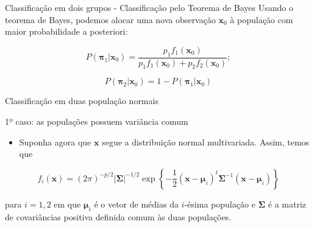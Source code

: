 \documentclass[
  ignorenonframetext,
  aspectratio=169,
]{beamer}
\providecommand{\tightlist}{%
  \setlength{\itemsep}{0pt}\setlength{\parskip}{0pt}}
\begin{document}
\begin{frame}{Classificação em dois grupos - Classificação pelo Teorema
de Bayes}
\label{classificauxe7uxe3o-em-dois-grupos---classificauxe7uxe3o-pelo-teorema-de-bayes}
Usando o teorema de Bayes, podemos alocar uma nova observação
\(\boldsymbol{x}_0\) à população com maior probabilidade a posteriori:

\[P(\boldsymbol{\pi}_1|\boldsymbol{x}_0) = \dfrac{p_1f_1(\boldsymbol{x}_0)}{p_1f_1(\boldsymbol{x}_0) + p_2f_2(\boldsymbol{x}_0)};\]

\[P(\boldsymbol{\pi}_2|\boldsymbol{x}_0) = 1 - P(\boldsymbol{\pi}_1|\boldsymbol{x}_0)\]
\end{frame}

\begin{frame}{Classificação em duas população normais}
\label{classificauxe7uxe3o-em-duas-populauxe7uxe3o-normais}
\begin{block}{1º caso: as populações possuem variância comum}
\label{uxba-caso-as-populauxe7uxf5es-possuem-variuxe2ncia-comum}
\begin{itemize}
\tightlist
\item
  Suponha agora que \(\boldsymbol{x}\) segue a distribuição normal
  multivariada. Assim, temos que
\end{itemize}

\[f_i(\boldsymbol{x}) = \left( 2\pi\right) ^{-p/2}\left| \boldsymbol{\Sigma} \right| ^{-1/2} \exp\left\lbrace -\dfrac{1}{2} \left( \boldsymbol{x} - \boldsymbol{\mu}_i\right) ^t \boldsymbol{\Sigma}^{-1} \left( \boldsymbol{x} - \boldsymbol{\mu}_i\right) \right\rbrace \]

para \(i = 1,2\) em que \(\boldsymbol{\mu}_i\) é o vetor de médias da
\(i\)-ésima população e \(\boldsymbol{\Sigma}\) é a matriz de
covariâncias positiva definida comum às duas populações.
\end{block}
\end{frame}
\end{document}
